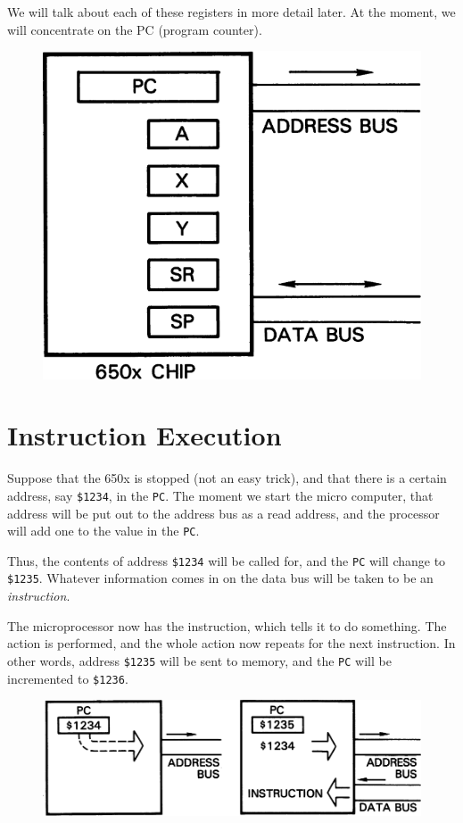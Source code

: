 \documentclass[11pt,a4paper,titlepage]{memoir}
\begin{document}
We will talk about each of these registers in more detail later. At the
moment, we will concentrate on the PC (program counter).
\begin{figure}[h]
	\centering
	\includegraphics[width=1\linewidth]{screenshot007}
	\caption{}
	\label{fig:screenshot007}
\end{figure}

\section{Instruction Execution}
Suppose that the 650x is stopped (not an easy trick), and that there is a
certain address, say \texttt{\$1234}, in the \texttt{PC}. The moment we start the micro
computer, that address will be put out to the address bus as a read address,
and the processor will add one to the value in the \texttt{PC}.

Thus, the contents of address \texttt{\$1234} will be called for, and the \texttt{PC} will
change to \texttt{\$1235}. Whatever information comes in on the data bus will
be taken to be an \emph{instruction}.

The microprocessor now has the instruction, which tells it to do something.
The action is performed, and the whole action now repeats for the next instruction. In other words, address \texttt{\$1235} will be sent to memory, and
the \texttt{PC} will be incremented to \texttt{\$1236}.
\begin{figure}
	\centering
	\includegraphics[width=1\linewidth]{screenshot008}
	\caption{}
	\label{fig:screenshot008}
\end{figure}
\end{document}
